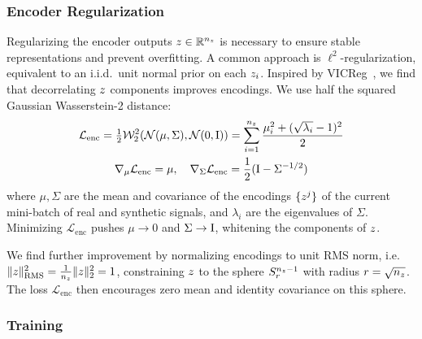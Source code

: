 \subsubsection{Encoder Regularization}\label{subsubsec:encoder_regularization}

Regularizing the encoder outputs $z \in \mathbb{R}^{n_{z}}$ is necessary to ensure stable representations and prevent overfitting.
A common approach is $\ell^2$-regularization, equivalent to an i.i.d.\ unit normal prior on each $z_i$.
Inspired by VICReg~\citep{bardes_vicreg_2021}, we find that decorrelating $z$ components improves encodings.
We use half the squared Gaussian Wasserstein-2 distance:
\begin{gather}
    \mathcal{L}_{\text{enc}} = \tfrac12 \mathcal{W}_2^2(\mathcal{N}(\mu, \Sigma), \mathcal{N}(0, \mathrm{I})) = \sum_{i=1}^{n_{z}} \frac{\mu_i^2 + (\sqrt{\lambda_i} - 1)^2}{2} \label{eqn:w2_gaussian} \\
    \nabla_\mu \mathcal{L}_{\text{enc}} = \mu, \quad \nabla_\Sigma \mathcal{L}_{\text{enc}} = \frac{1}{2} (\mathrm{I} - \Sigma^{-1/2}) \label{eqn:w2_gaussian_gradients}
\end{gather}
where $\mu, \Sigma$ are the mean and covariance of the encodings $\{ z^{j} \}$ of the current mini-batch of real and synthetic signals, and $\lambda_i$ are the eigenvalues of $\Sigma$.
Minimizing $\mathcal{L}_{\text{enc}}$ pushes $\mu \to 0$ and $\Sigma \to \mathrm{I}$, whitening the components of $z$.

We find further improvement by normalizing encodings to unit \gls*{RMS} norm, i.e.\ $\lVert z \rVert_{\text{RMS}}^2 = \frac{1}{n_{z}}\lVert z \rVert_2^2 = 1$, constraining $z$ to the sphere $S_{r}^{n_{z} - 1}$ with radius $r = \sqrt{n_{z}}$.
The loss $\mathcal{L}_{\text{enc}}$ then encourages zero mean and identity covariance on this sphere.

\subsubsection{Training}\label{subsubsec:training_details}

